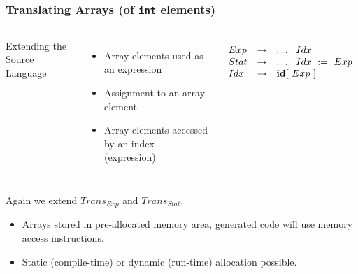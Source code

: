 \documentclass{beamer}
\newcommand{\codesize}{\footnotesize}
\newcommand{\cd}[1]{{{\codesize\tt #1}}}
\renewcommand{\emph}[1]{\textcolor{structure}{#1}}
\newcommand{\emp}[1]{\textcolor{DikuRed}{ #1}}
\begin{document}
\begin{frame}[fragile,t]
	\frametitle{Translating Arrays (of {\tt int} elements)}

\begin{columns}

\emph{Extending the Source Language}
\medskip

\begin{itemize}
\item Array elements used as an expression
\item Assignment to an array element
\item Array elements accessed by an index (expression)
\end{itemize}


{\footnotesize

\renewcommand{\arraystretch}{1.1}
\[\begin{array}{lcl}
Exp & \rightarrow & \ldots \mid Idx\\
Stat & \rightarrow & \ldots \mid Idx ~:=~ Exp \\
Idx & \rightarrow & {\bf id}[~Exp~]\\
\end{array}\]

}
\end{columns}

\bigskip

\pause

Again we \emp{extend $Trans_{Exp}$ and $Trans_{Stat}$}.

\begin{itemize}

\item Arrays stored in \emph{pre-allocated memory area}, 
	generated code will \emph{use memory access instructions}.

\item Static (compile-time) or dynamic (run-time) allocation possible.

%
%
%
\end{itemize}

\end{frame}
\end{document}
